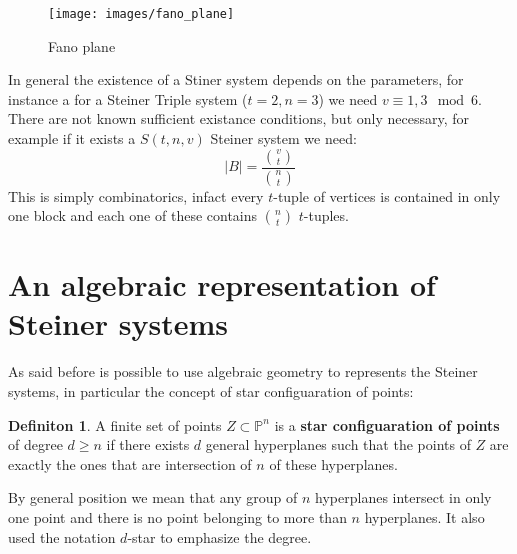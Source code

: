 \documentclass[]{book}
\theoremstyle{plain}
\theoremstyle{remark}
\theoremstyle{definition}
\newtheorem{deff}[teo]{Definiton}
\newcommand{\PP}{\mathbb{P}}
\begin{document}
\begin{verbatim*}
%Bho non va
\begin{figure}
\texttt{[image: images/fano\_plane]}
\caption{Fano plane}
\label{fig:fanoplane}
\end{figure}
\end{verbatim*}

In general the existence of a Stiner system depends on the parameters, for instance a for a Steiner Triple system ($ t=2, n=3 $) we need $ v \equiv 1,3 \mod 6 $. There are not known sufficient existance conditions, but only necessary, for example if it exists a $ S(t,n,v) $ Steiner system we need: 
\[
	|B| = \frac{\binom{v}{t}}{\binom{n}{t}}
\]
This is simply combinatorics, infact every $ t $-tuple of vertices is contained in only one block and each one of these contains $ \binom{n}{t} $ $ t $-tuples. 

\section[Ideal of Steyner configuartion]{An algebraic representation of Steiner systems}

As said before is possible to use algebraic geometry to represents the Steiner systems, in particular the concept of star configuaration of points:

\begin{deff} \label{def:starconf}
A finite set of points $ Z \subset \PP^n $ is a \textbf{star configuaration of points} of degree $ d \geq n $ if there exists $ d $ general hyperplanes such that the points of $ Z $ are exactly the ones that are intersection of $ n $ of these hyperplanes.
\end{deff}
By general position we mean that any group of $ n $ hyperplanes intersect in only one point and there is no point belonging to more than $ n $ hyperplanes. It also used the notation $ d $-star to emphasize the degree. 
\end{document}
